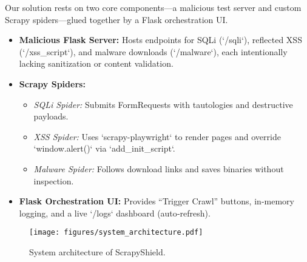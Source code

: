 


Our solution rests on two core components—a malicious test server and custom Scrapy spiders—glued together by a Flask orchestration UI.

\begin{itemize}
  \item \textbf{Malicious Flask Server:} Hosts endpoints for SQLi (`/sqli`), reflected XSS (`/xss_script`), and malware downloads (`/malware`), each intentionally lacking sanitization or content validation.
  \item \textbf{Scrapy Spiders:}
    \begin{itemize}
      \item \emph{SQLi Spider:} Submits FormRequests with tautologies and destructive payloads.
      \item \emph{XSS Spider:} Uses `scrapy-playwright` to render pages and override `window.alert()` via `add_init_script`.
      \item \emph{Malware Spider:} Follows download links and saves binaries without inspection.
    \end{itemize}
  \item \textbf{Flask Orchestration UI:} Provides “Trigger Crawl” buttons, in‐memory logging, and a live `/logs` dashboard (auto‐refresh).
\end{itemize}

\begin{figure}[ht]
  \centering
  \texttt{[image: figures/system\_architecture.pdf]}
  \caption{System architecture of ScrapyShield.}
  \label{fig:architecture}
\end{figure}

